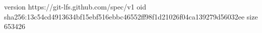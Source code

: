 version https://git-lfs.github.com/spec/v1
oid sha256:13c54cd4913634bf15ebf516ebbc46552ff98f1d21026f04ca139279d56032ee
size 653426
